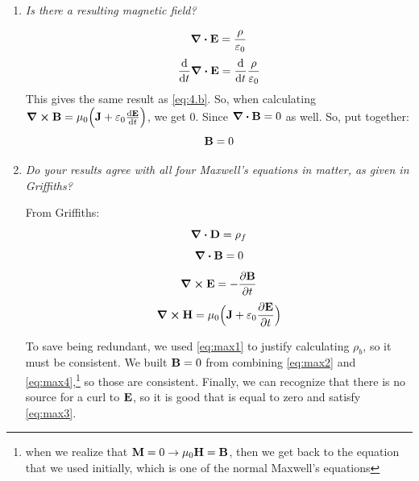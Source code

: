 \documentclass[12pt]{article}
\begin{document}
\begin{enumerate}[label=\alph*)]
\item \emph{Is there a resulting magnetic field?}\bigskip

\[\div{\vb{E}} = \frac{\rho}{\varepsilon_0}\]
\[\dv{t}\div{\vb{E}} = \dv{t}\frac{\rho}{\varepsilon_0}\]
This gives the same result as \eqref{eq:4.b}. So, when calculating $\curl{\vb{B}} = \mu_0\Big(\vb{J} + \varepsilon_0 \dv{\vb{E}}{t}\Big)$, we get 0. Since $\div{\vb{B}} = 0$ as well. So, put together:
\[\vb{B} = 0\]
 

\item \emph{Do your results agree with all four Maxwell's equations in matter, as given in Griffiths?}\bigskip

From Griffiths:
\begin{equation}
\div{\vb{D}} = \rho_f
\label{eq:max1}
\end{equation} 
\begin{equation}
\div{\vb{B}} = 0
\label{eq:max2}
\end{equation} 
\begin{equation}
\curl{\vb{E}} = -\pdv{\vb{B}}{t}
\label{eq:max3}
\end{equation} 
\begin{equation}
\curl{\vb{H}} = \mu_0\Big(\vb{J} + \varepsilon_0 \pdv{\vb{E}}{t}\Big)
\label{eq:max4}
\end{equation} 

To save being redundant, we used \eqref{eq:max1} to justify calculating $\rho_b$, so it must be consistent. We built $\vb{B}= 0 $ from combining \eqref{eq:max2} and \eqref{eq:max4},\footnote{when we realize that $\vb{M} = 0 \rightarrow \mu_0\vb{H} = \vb{B}$, then we get back to the equation that we used initially, which is one of the normal Maxwell's equations} so those are consistent. Finally, we can recognize that there is no source for a curl to $\vb{E}$, so it is good that is equal to zero and satisfy \eqref{eq:max3}.

\end{enumerate}
\end{document}
